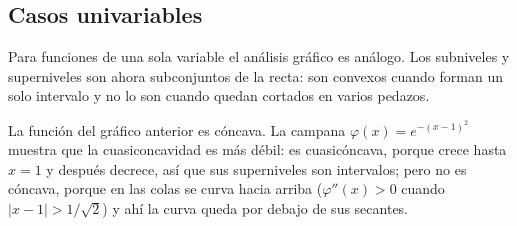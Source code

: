 \documentclass{article}
\begin{document}
\subsection*{Casos univariables}
Para funciones de una sola variable el análisis gráfico es análogo. Los subniveles y superniveles son ahora subconjuntos de la recta: son convexos cuando forman un solo intervalo y no lo son cuando quedan cortados en varios pedazos.
\begin{center}
\end{center}

La función del gráfico anterior es cóncava. La campana \(\varphi(x)=e^{-(x-1)^2}\) muestra que la cuasiconcavidad es más débil: es cuasicóncava, porque crece hasta \(x=1\) y después decrece, así que sus superniveles son intervalos; pero no es cóncava, porque en las colas se curva hacia arriba (\(\varphi''(x)>0\) cuando \(|x-1|>1/\sqrt2\)) y ahí la curva queda por debajo de sus secantes.
\end{document}
